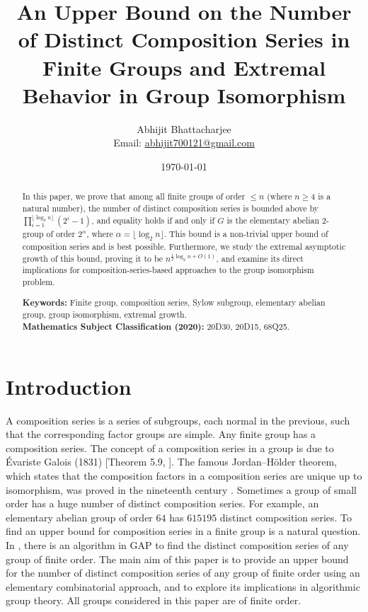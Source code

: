 \documentclass[11pt,a4paper]{article}
\title{\textbf{An Upper Bound on the Number of Distinct Composition Series in Finite Groups and Extremal Behavior in Group Isomorphism}}
\author{Abhijit Bhattacharjee\\
\small Email: \href{mailto:abhijit700121@gmail.com}{abhijit700121@gmail.com}}
\date{\today}
\theoremstyle{definition}
\begin{document}
\maketitle

\begin{abstract}
In this paper, we prove that among all finite groups of order $\le n$ (where $n \ge 4$ is a natural number), the number of distinct composition series is bounded above by $\prod_{i=1}^{\lfloor \log_2 n \rfloor} (2^i - 1)$, and equality holds if and only if $G$ is the elementary abelian 2-group of order $2^\alpha$, where $\alpha = \lfloor \log_2 n \rfloor$. This bound is a non-trivial upper bound of composition series and is best possible. Furthermore, we study the extremal asymptotic growth of this bound, proving it to be $n^{\frac{1}{2}\log_2 n + O(1)}$, and examine its direct implications for composition-series-based approaches to the group isomorphism problem.

\medskip
\noindent \textbf{Keywords:} Finite group, composition series, Sylow subgroup, elementary abelian group, group isomorphism, extremal growth. \\
\noindent \textbf{Mathematics Subject Classification (2020):} 20D30, 20D15, 68Q25.
\end{abstract}

\section{Introduction}

A composition series is a series of subgroups, each normal in the previous, such that the corresponding factor groups are simple. Any finite group has a composition series. The concept of a composition series in a group is due to Évariste Galois (1831) [Theorem 5.9, \cite{rotman}]. The famous Jordan--Hölder theorem, which states that the composition factors in a composition series are unique up to isomorphism, was proved in the nineteenth century \cite{jordan, holder}. Sometimes a group of small order has a huge number of distinct composition series. For example, an elementary abelian group of order $64$ has $615195$ distinct composition series. To find an upper bound for composition series in a finite group is a natural question. In \cite{hulpke}, there is an algorithm in GAP to find the distinct composition series of any group of finite order. The main aim of this paper is to provide an upper bound for the number of distinct composition series of any group of finite order using an elementary combinatorial approach, and to explore its implications in algorithmic group theory. All groups considered in this paper are of finite order.
\end{document}
